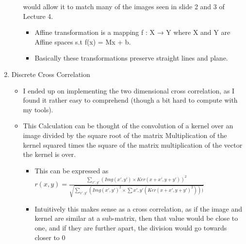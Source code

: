 \documentclass{article}
\begin{document}
\begin{enumerate}
\begin{itemize}
would allow it to match many of the images seen in slide 2 and 3 of
Lecture 4.
\begin{itemize}
\item Affine transformation is a mapping f : X → Y where X and Y are
Affine spaces s.t f(x) = Mx + b.
\item Basically these transformations preserve straight lines and plane.
\end{itemize}
\end{itemize}
\item Discrete Cross Correlation
\label{sec-1-4}
\begin{itemize}
\item I ended up on implementing the two dimensional cross correlation, as
I found it rather easy to comprehend (though a bit hard to compute
with my tools).
\item This Calculation can be thought of the convolution of a kernel over
an image divided by the square root of the matrix Multiplication of
the kernel squared times the square of the matrix multiplication of
the vector the kernel is over.
\begin{itemize}
\item This can be expressed as $r(x,y) = \frac{\sum_{x',y'}(Img(x',y') × Ker(x + x', y + y'))^2}{\sqrt{\sum_{x',y'}(Img(x',y')^2 × \sum{x',y'}(Ker(x + x', y + y')^2)))}}$
\item Intuitively this makes sense as a cross correlation, as if the
image and kernel are similar at a sub-matrix, then that value would
be close to one, and if they are further apart, the division would
go towards closer to 0
\end{itemize}
\end{itemize}
\end{enumerate}
\end{document}
